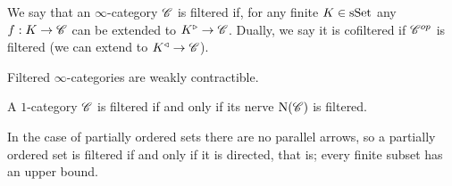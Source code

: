 \documentclass[../../thesis.tex]{subfiles}
\begin{document}
\begin{definition}
    We say that an $\infty$-category $\mathscr{C}$ is filtered if, for any finite $K\in \mathrm{sSet}$ any $f:K\to \mathscr{C}$ can be extended to $K^{\triangleright} \to \mathscr{C}$.
    Dually, we say it is cofiltered if $\mathscr{C}^{op}$ is filtered (we can extend to $K^{\triangleleft} \to \mathscr{C}$).
\end{definition}
\begin{proposition}\label{5.3.1.20}
    Filtered $\infty$-categories are weakly contractible.
\end{proposition}
\begin{proposition}\label{NerveFilter}
    A $1$-category $\mathscr{C}$ is filtered if and only if its nerve $\mathrm{N}(\mathscr{C})$ is filtered.
\end{proposition}
\begin{remark}\label{filteredposet}
    In the case of partially ordered sets there are no parallel arrows, so a partially ordered set is filtered if and only if it is directed, that is; every finite subset has an upper bound.
\end{remark}
\end{document}
